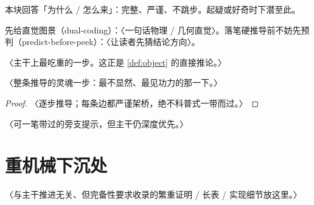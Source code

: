 \documentclass{keensight}
\begin{document}
\begin{deriv}
本块回答「为什么 / 怎么来」：完整、严谨、不跳步。起疑或好奇时下潜至此。

先给直觉图景（dual-coding）：〈一句话物理 / 几何直觉〉。落笔硬推导前不妨先预判（predict-before-peek）：〈让读者先猜结论方向〉。

\begin{keystep}
〈主干上最吃重的一步。这正是 \cref{def:object} 的直接推论。〉
\end{keystep}

\begin{soul}
〈整条推导的灵魂一步：最不显然、最见功力的那一下。〉
\end{soul}

\begin{proof}
〈逐步推导；每条边都严谨架桥，绝不科普式一带而过。〉
\end{proof}

\begin{remark}
〈可一笔带过的旁支提示，但主干仍深度优先。〉
\end{remark}
\end{deriv}

\appendix
\chapter{重机械下沉处}

〈与主干推进无关、但完备性要求收录的繁重证明 / 长表 / 实现细节放这里。〉
\end{document}
